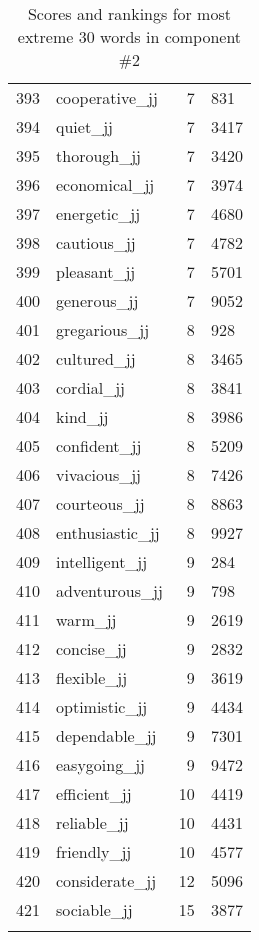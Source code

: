 \begin{longtable}[!htbp]{| rlr@{.}l |}
    393 & cooperative\_jj & 7 & 831 \\
    394 & quiet\_jj & 7 & 3417 \\
    395 & thorough\_jj & 7 & 3420 \\
    396 & economical\_jj & 7 & 3974 \\
    397 & energetic\_jj & 7 & 4680 \\
    398 & cautious\_jj & 7 & 4782 \\
    399 & pleasant\_jj & 7 & 5701 \\
    400 & generous\_jj & 7 & 9052 \\
    401 & gregarious\_jj & 8 & 928 \\
    402 & cultured\_jj & 8 & 3465 \\
    403 & cordial\_jj & 8 & 3841 \\
    404 & kind\_jj & 8 & 3986 \\
    405 & confident\_jj & 8 & 5209 \\
    406 & vivacious\_jj & 8 & 7426 \\
    407 & courteous\_jj & 8 & 8863 \\
    408 & enthusiastic\_jj & 8 & 9927 \\
    409 & intelligent\_jj & 9 & 284 \\
    410 & adventurous\_jj & 9 & 798 \\
    411 & warm\_jj & 9 & 2619 \\
    412 & concise\_jj & 9 & 2832 \\
    413 & flexible\_jj & 9 & 3619 \\
    414 & optimistic\_jj & 9 & 4434 \\
    415 & dependable\_jj & 9 & 7301 \\
    416 & easygoing\_jj & 9 & 9472 \\
    417 & efficient\_jj & 10 & 4419 \\
    418 & reliable\_jj & 10 & 4431 \\
    419 & friendly\_jj & 10 & 4577 \\
    420 & considerate\_jj & 12 & 5096 \\
    421 & sociable\_jj & 15 & 3877 \\
    \hline
    \caption{Scores and rankings for most extreme 30 words in component \#2} \\
\end{longtable}
